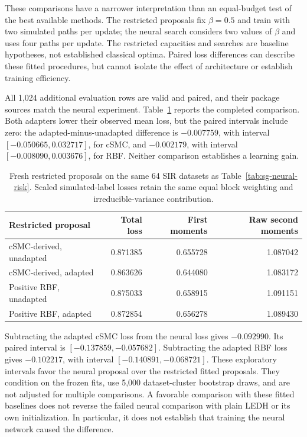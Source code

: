 These comparisons have a narrower interpretation than an equal-budget test of
the best available methods. The restricted proposals fix \(\beta=0.5\) and
train with two simulated paths per update; the neural search considers two
values of \(\beta\) and uses four paths per update. The restricted capacities
and searches are baseline hypotheses, not established classical optima. Paired
loss differences can describe these fitted procedures, but cannot isolate the
effect of architecture or establish training efficiency.

All 1,024 additional evaluation rows are valid and paired, and their package
sources match the neural experiment. Table~\ref{tab:sg-restricted-risk} reports
the completed comparison. Both adapters lower their observed mean loss, but
the paired intervals include zero: the adapted-minus-unadapted difference is
\(-0.007759\), with interval \([-0.050665,0.032717]\), for cSMC, and
\(-0.002179\), with interval \([-0.008090,0.003676]\), for RBF.
Neither comparison establishes a learning gain.

\begin{table}[ht]
\centering
\begin{tabular}{lrrr}
\toprule
Restricted proposal & Total loss & First moments & Raw second moments\\
\midrule
cSMC-derived, unadapted & 0.871385 & 0.655728 & 1.087042\\
cSMC-derived, adapted & 0.863626 & 0.644080 & 1.083172\\
Positive RBF, unadapted & 0.875033 & 0.658915 & 1.091151\\
Positive RBF, adapted & 0.872854 & 0.656278 & 1.089430\\
\bottomrule
\end{tabular}
\caption{Fresh restricted proposals on the same 64 SIR datasets as
Table~\ref{tab:sg-neural-risk}. Scaled simulated-label losses retain the same
equal block weighting and irreducible-variance contribution.}
\label{tab:sg-restricted-risk}
\end{table}

Subtracting the adapted cSMC loss from the neural loss gives \(-0.092990\).
Its paired interval is \([-0.137859,-0.057682]\). Subtracting the adapted
RBF loss gives \(-0.102217\), with interval \([-0.140891,-0.068721]\).
These exploratory
intervals favor the neural proposal over the restricted fitted proposals.
They condition on the frozen fits, use 5,000 dataset-cluster bootstrap draws,
and are not adjusted for multiple comparisons. A favorable comparison with
these fitted baselines does not reverse the failed neural comparison with
plain LEDH or its own initialization. In particular, it does not establish
that training the neural network caused the difference.

